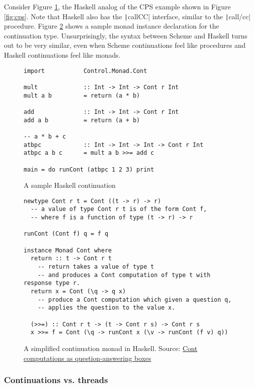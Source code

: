 \documentclass[]{article}
\begin{document}
Consider Figure \ref{fig:hask}, the Haskell analog of the CPS example shown in Figure \ref{fig:cps}. Note that Haskell also has the \texttt|callCC| interface, similar to the \texttt|call/cc| procedure. Figure \ref{fig:mona} shows a sample monad instance declaration for the continuation type. Unsurprisingly, the syntax between Scheme and Haskell turns out to be very similar, even when Scheme continuations feel like procedures and Haskell continuations feel like monads.

\begin{figure}[h]
  \centering
\begin{verbatim}
import           Control.Monad.Cont

mult             :: Int -> Int -> Cont r Int
mult a b         = return (a * b)

add              :: Int -> Int -> Cont r Int
add a b          = return (a + b)

-- a * b + c
atbpc            :: Int -> Int -> Int -> Cont r Int
atbpc a b c      = mult a b >>= add c

main = do runCont (atbpc 1 2 3) print
\end{verbatim}
  \caption{A sample Haskell continuation}
  \label{fig:hask}
\end{figure}

\begin{figure}[h]
  \centering
\begin{verbatim}
newtype Cont r t = Cont ((t -> r) -> r)
  -- a value of type Cont r t is of the form Cont f,
  -- where f is a function of type (t -> r) -> r

runCont (Cont f) q = f q

instance Monad Cont where
  return :: t -> Cont r t
    -- return takes a value of type t
    -- and produces a Cont computation of type t with response type r.
  return x = Cont (\q -> q x)
    -- produce a Cont computation which given a question q,
    -- applies the question to the value x.

  (>>=) :: Cont r t -> (t -> Cont r s) -> Cont r s
  x >>= f = Cont (\q -> runCont x (\v -> runCont (f v) q))
\end{verbatim}
  \caption{A simplified continuation monad in Haskell. Source: \href{https://wiki.haskell.org/Cont_computations_as_question-answering_boxes}{Cont computations as question-answering boxes}}
  \label{fig:mona}
\end{figure}

\subsubsection{Continuations vs. threads}
\label{sec:vsth}
\end{document}
